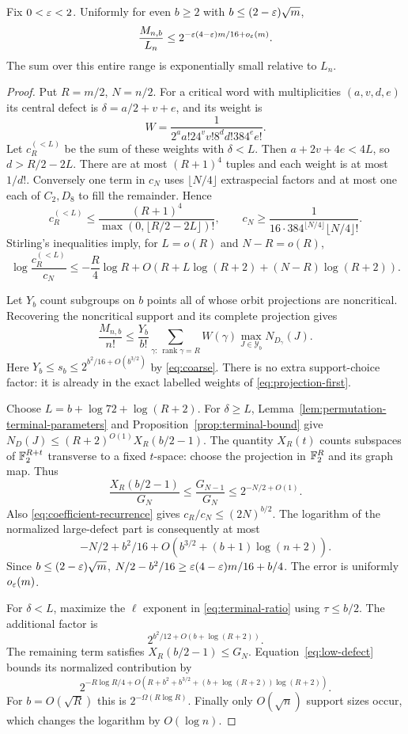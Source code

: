 \begin{theorem}\label{thm:small-support}
Fix $0<\varepsilon<2$. Uniformly for even $b\geq2$ with
$b\leq(2-\varepsilon)\sqrt m$,
\[
 \frac{M_{n,b}}{L_n}\leq
 2^{-\varepsilon(4-\varepsilon)m/16+o_\varepsilon(m)}.
\]
The sum over this entire range is exponentially small relative to $L_n$.
\end{theorem}
\begin{proof}
Put $R=m/2$, $N=n/2$. For a critical word with multiplicities
$(a,v,d,e)$ its central defect is $\delta=a/2+v+e$, and its weight is
\[
 W=\frac1{2^aa!24^vv!8^dd!384^ee!}.
\]
Let $c_R^{(<L)}$ be the sum of these weights with $\delta<L$.
Then $a+2v+4e<4L$, so $d>R/2-2L$. There are at most $(R+1)^4$
tuples and each weight is at most $1/d!$. Conversely one term in $c_N$
uses $\lfloor N/4\rfloor$ extraspecial factors and at most one each
of $C_2,D_8$ to fill the remainder. Hence
\[
 c_R^{(<L)}\leq\frac{(R+1)^4}{\max(0,\lfloor R/2-2L\rfloor)!},
 \qquad
 c_N\geq\frac1{16\cdot384^{\lfloor N/4\rfloor}\lfloor N/4\rfloor!}.
\]
Stirling's inequalities imply, for $L=o(R)$ and $N-R=o(R)$,
\begin{equation}\label{eq:low-defect}
 \log\frac{c_R^{(<L)}}{c_N}
 \leq-\frac R4\log R+O(R+L\log(R+2)+(N-R)\log(R+2)).
\end{equation}

Let $Y_b$ count subgroups on $b$ points all of whose orbit projections
are noncritical. Recovering the noncritical support and its complete
projection gives
\begin{equation}\label{eq:projection-first}
 \frac{M_{n,b}}{n!}\leq\frac{Y_b}{b!}
 \sum_{\gamma:\,\operatorname{rank}\gamma=R}W(\gamma)
       \max_{J\in\mathcal Y_b}N_{D_\gamma}(J).
\end{equation}
Here $Y_b\leq s_b\leq2^{b^2/16+O(b^{3/2})}$ by \eqref{eq:coarse}.
There is no extra support-choice factor: it is already in the exact
labelled weights of \eqref{eq:projection-first}.

Choose $L=b+\log72+\log(R+2)$. For $\delta\geq L$,
Lemma~\ref{lem:permutation-terminal-parameters} and
Proposition~\ref{prop:terminal-bound} give
$N_D(J)\leq(R+2)^{O(1)}X_R(b/2-1)$.
The quantity $X_R(t)$ counts subspaces of $\mathbb F_2^{R+t}$ transverse
to a fixed $t$-space: choose the projection in $\mathbb F_2^R$ and its graph
map. Thus
\[
 \frac{X_R(b/2-1)}{G_N}\leq\frac{G_{N-1}}{G_N}
              \leq2^{-N/2+O(1)}.
\]
Also \eqref{eq:coefficient-recurrence} gives
$c_R/c_N\leq(2N)^{b/2}$. The logarithm of the normalized large-defect
part is consequently at most
\[
 -N/2+b^2/16+O(b^{3/2}+(b+1)\log(n+2)).
\]
Since $b\leq(2-\varepsilon)\sqrt m$,
$N/2-b^2/16\geq\varepsilon(4-\varepsilon)m/16+b/4$.
The error is uniformly $o_\varepsilon(m)$.

For $\delta<L$, maximize the $\ell$ exponent in
\eqref{eq:terminal-ratio} using $\tau\leq b/2$. The additional factor is
\[
 2^{b^2/12+O(b+\log(R+2))}.
\]
The remaining term satisfies $X_R(b/2-1)\leq G_N$.
Equation~\eqref{eq:low-defect} bounds its normalized contribution by
\[
 2^{-R\log R/4+O(R+b^2+b^{3/2}+(b+\log(R+2))\log(R+2))}.
\]
For $b=O(\sqrt R)$ this is $2^{-\Omega(R\log R)}$.
Finally only $O(\sqrt n)$ support sizes occur, which changes the
logarithm by $O(\log n)$.
\end{proof}

